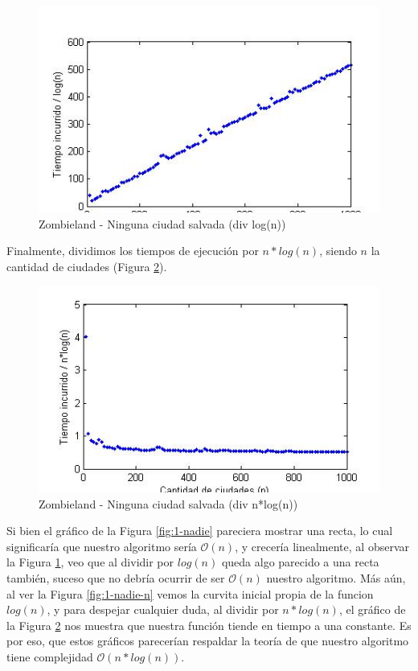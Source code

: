 \begin{figure}[htb]
	\begin{center}
    		\includegraphics[scale=0.5]{imagenes/1-nosesalvanadie-div-logn.jpg}
	\end{center}
	\caption{Zombieland - Ninguna ciudad salvada (div log(n))}\label{fig:1-nadie-logn}
\end{figure}

Finalmente, dividimos los tiempos de ejecución por $n*log(n)$, siendo $n$ la cantidad de ciudades (Figura \ref{fig:1-nadie-nlogn}).

\begin{figure}[htb]
	\begin{center}
    		\includegraphics[scale=0.5]{imagenes/1-nosesalvanadie-div-nlogn.jpg}
	\end{center}
	\caption{Zombieland - Ninguna ciudad salvada (div n*log(n))}\label{fig:1-nadie-nlogn}
\end{figure}

Si bien el gráfico de la Figura \ref{fig:1-nadie} pareciera mostrar una recta, lo cual significaría que nuestro algoritmo sería $\mathcal{O}(n)$, y crecería linealmente, al observar la Figura \ref{fig:1-nadie-logn}, veo que al dividir por $log(n)$ queda algo parecido a una recta también, suceso que no debría ocurrir de ser $\mathcal{O}(n)$ nuestro algoritmo. Más aún, al ver la Figura \ref{fig:1-nadie-n} vemos la curvita inicial propia de la funcion $log(n)$, y para despejar cualquier duda, al dividir por $n*log(n)$, el gráfico de la Figura \ref{fig:1-nadie-nlogn} nos muestra que nuestra función tiende en tiempo a una constante. Es por eso, que estos gráficos parecerían respaldar la teoría de que nuestro algoritmo tiene complejidad $\mathcal{O}(n*log(n))$.

